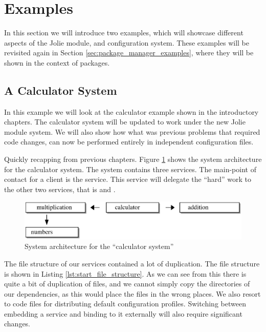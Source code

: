 \section{Examples}
\label{sec:module_examples}

In this section we will introduce two examples, which will showcase different
aspects of the Jolie module, and configuration system. These examples will be
revisited again in Section \ref{sec:package_manager_examples}, where they will
be shown in the context of packages.

\subsection{A Calculator System}

In this example we will look at the calculator example shown in the
introductory chapters. The calculator system will be updated to work under the
new Jolie module system. We will also show how what was previous problems that
required code changes, can now be performed entirely in independent
configuration files.

Quickly recapping from previous chapters.  Figure \ref{fig:simple_calc} shows
the system architecture for the calculator system. The system contains three
services. The main-point of contact for a client is the 
service. This service will delegate the ``hard'' work to the other two
services, that is  and .

\begin{figure}[H]
\centering
\includegraphics[width=1.0\textwidth]{modules/simple_calc.eps}
\caption{System architecture for the ``calculator system''}
\label{fig:simple_calc}
\end{figure}

The file structure of our services contained a lot of duplication. The file
structure is shown in Listing \ref{lst:start_file_structure}. As we can see
from this there is quite a bit of duplication of files, and we cannot simply
copy the directories of our dependencies, as this would place the files in the
wrong places. We also resort to code files for distributing default
configuration profiles. Switching between embedding a service and binding to it
externally will also require significant changes.

